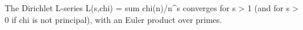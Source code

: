 The Dirichlet L-series L(s,chi) = sum chi(n)/n^s converges for s > 1 (and for s > 0 if chi is not principal), with an Euler product over primes.
